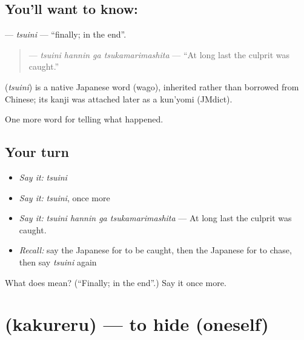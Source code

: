\subsection*{You'll want to know: }
\textbf{} — \emph{tsuini} — \textquotedblleft{}finally; in the end\textquotedblright{}.

\begin{quote}
\textbf{  } — \emph{tsuini hannin ga tsukamarimashita} — \textquotedblleft{}At long last the culprit was caught.\textquotedblright{}
\end{quote}

\begin{cousinweb}
\textbf{} (\emph{tsuini}) is a native Japanese word (wago), inherited rather than borrowed from Chinese; its kanji was attached later as a kun'yomi (JMdict).
\end{cousinweb}

\begin{grammarlens}[title={What you've built}]
One more word for telling what happened.
\end{grammarlens}

\subsection*{Your turn}
\begin{itemize}
\raggedright
  \item \emph{Say it:} \emph{tsuini}
  \item \emph{Say it:} \emph{tsuini}, once more
  \item \emph{Say it:} \emph{tsuini hannin ga tsukamarimashita} — At long last the culprit was caught.
  \item \emph{Recall:} say the Japanese for to be caught, then the Japanese for to chase, then say \emph{tsuini} again
\end{itemize}

\begin{tcolorbox}[breakable,colback=teal!4,colframe=teal!35!black,title={Before you move on}]
What does  mean? (\textquotedblleft{}Finally; in the end\textquotedblright{}.) Say it once more.
\end{tcolorbox}
\section[\texorpdfstring{\ja{かくれる} (kakureru)}{かくれる (kakureru)}]{ (kakureru) — to hide (oneself)}

